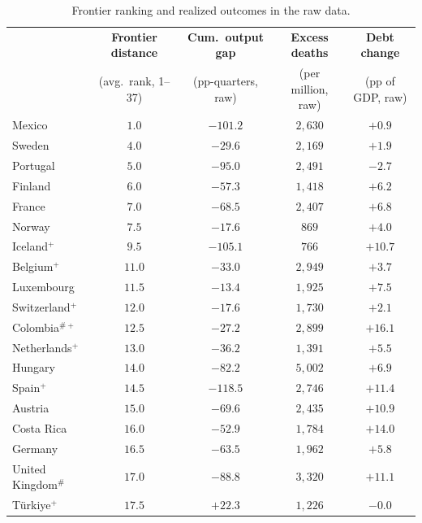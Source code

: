 \documentclass[12pt, a4paper]{article}
\begin{document}
\begin{table}[H]
\centering
\scriptsize
\caption{Frontier ranking and realized outcomes in the raw data.}
\label{tab:country_raw_outcomes}
\begin{tabular}{lc ccc}
\toprule
 & \textbf{Frontier distance} & \textbf{Cum.\ output gap} & \textbf{Excess deaths} & \textbf{Debt change} \\
 & (avg.\ rank, 1--37) & (pp-quarters, raw) & (per million, raw) & (pp of GDP, raw) \\
\midrule
Mexico                  & $1.0$  & $-101.2$ & $2{,}630$ & $+0.9$  \\
Sweden                  & $4.0$  & $-29.6$  & $2{,}169$ & $+1.9$  \\
Portugal                & $5.0$  & $-95.0$  & $2{,}491$ & $-2.7$  \\
Finland                 & $6.0$  & $-57.3$  & $1{,}418$ & $+6.2$  \\
France                  & $7.0$  & $-68.5$  & $2{,}407$ & $+6.8$  \\
Norway                  & $7.5$  & $-17.6$  & $869$     & $+4.0$  \\
Iceland\(^{+}\)         & $9.5$  & $-105.1$ & $766$     & $+10.7$ \\
Belgium\(^{+}\)         & $11.0$ & $-33.0$  & $2{,}949$ & $+3.7$  \\
Luxembourg              & $11.5$ & $-13.4$  & $1{,}925$ & $+7.5$  \\
Switzerland\(^{+}\)     & $12.0$ & $-17.6$  & $1{,}730$ & $+2.1$  \\
Colombia\(^{\#+}\)      & $12.5$ & $-27.2$  & $2{,}899$ & $+16.1$ \\
Netherlands\(^{+}\)     & $13.0$ & $-36.2$  & $1{,}391$ & $+5.5$  \\
Hungary                 & $14.0$ & $-82.2$  & $5{,}002$ & $+6.9$  \\
Spain\(^{+}\)           & $14.5$ & $-118.5$ & $2{,}746$ & $+11.4$ \\
Austria                 & $15.0$ & $-69.6$  & $2{,}435$ & $+10.9$ \\
Costa Rica              & $16.0$ & $-52.9$  & $1{,}784$ & $+14.0$ \\
Germany                 & $16.5$ & $-63.5$  & $1{,}962$ & $+5.8$  \\
United Kingdom\(^{\#}\) & $17.0$ & $-88.8$  & $3{,}320$ & $+11.1$ \\
T\"urkiye\(^{+}\)       & $17.5$ & $+22.3$  & $1{,}226$ & $-0.0$  \\

\end{tabular}
\end{table}
\end{document}

